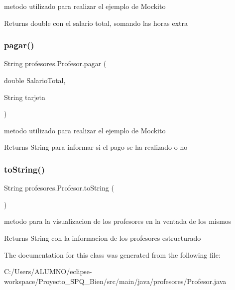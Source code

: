 metodo utilizado para realizar el ejemplo de Mockito \begin{DoxyReturn}{Returns}
double con el salario total, somando las horas extra 
\end{DoxyReturn}
\mbox{\label{classprofesores_1_1_profesor_a301255f4c88fd769cfca0667d743c80f}} 
\subsubsection{\texorpdfstring{pagar()}{pagar()}}
{\footnotesize\ttfamily String profesores.\+Profesor.\+pagar (\begin{DoxyParamCaption}\item[{double}]{Salario\+Total,  }\item[{String}]{tarjeta }\end{DoxyParamCaption})}

metodo utilizado para realizar el ejemplo de Mockito \begin{DoxyReturn}{Returns}
String para informar si el pago se ha realizado o no 
\end{DoxyReturn}
\mbox{\label{classprofesores_1_1_profesor_ac8119d859ea0285c0d85c3a6ad180ee1}} 
\subsubsection{\texorpdfstring{to\+String()}{toString()}}
{\footnotesize\ttfamily String profesores.\+Profesor.\+to\+String (\begin{DoxyParamCaption}{ }\end{DoxyParamCaption})}

metodo para la visualizacion de los profesores en la ventada de los mismos \begin{DoxyReturn}{Returns}
String con la informacion de los profesores estructurado 
\end{DoxyReturn}


The documentation for this class was generated from the following file\+:\begin{DoxyCompactItemize}
\item 
C\+:/\+Users/\+A\+L\+U\+M\+N\+O/eclipse-\/workspace/\+Proyecto\+\_\+\+S\+P\+Q\+\_\+Bien/src/main/java/profesores/Profesor.\+java\end{DoxyCompactItemize}
